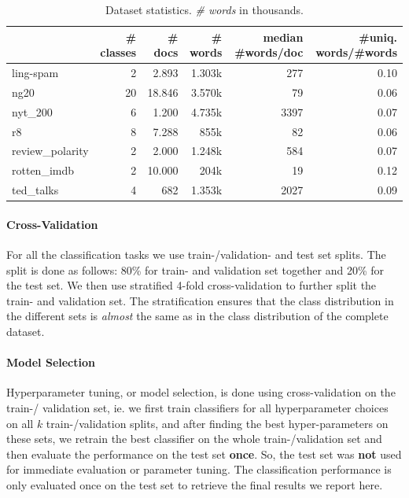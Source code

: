 
\begin{table}[htb!]
\centering
\begin{tabular}{lrrrrr}
{} &  \# classes &  \# docs & \# words & median \#words/doc &  \#uniq. words/\#words \\
\midrule
ling-spam       & 2 &  2.893 &  1.303k & 277 & 0.10 \\
ng20            & 20 &  18.846 &  3.570k & 79 & 0.06 \\
nyt\_200         & 6 &  1.200 &  4.735k & 3397 & 0.07 \\
r8              & 8 &  7.288 &  855k & 82 & 0.06 \\
review\_polarity & 2 &  2.000 &  1.248k & 584 & 0.07 \\
rotten\_imdb     & 2 &  10.000 &  204k & 19 & 0.12 \\
ted\_talks       & 4 &  682 &  1.353k & 2027 & 0.09 \\
\bottomrule
\end{tabular}
\caption[Statistics: Datasets]{Dataset statistics. \textit{\# words} in thousands.}\label{table:dataset_statistics}
\end{table}



\paragraph{Cross-Validation}
For all the classification tasks we use train-/validation- and test set splits.
The split is done as follows: 80\% for train- and validation set together and 20\% for the test set.
We then use stratified 4-fold cross-validation to further split the train- and validation set.
The stratification ensures that the class distribution in the different sets is \textit{almost} the same as in the class distribution of the complete dataset.

\paragraph{Model Selection}
Hyperparameter tuning, or model selection, is done using cross-validation on the train-/ validation set, ie. we first train classifiers for all hyperparameter choices on all $k$ train-/validation splits, and after finding the best hyper-parameters on these sets, we retrain the best classifier on the whole train-/validation set and then evaluate the performance on the test set \textbf{once}.
So, the test set was \textbf{not} used for immediate evaluation or parameter tuning.
The classification performance is only evaluated once on the test set to retrieve the final results we report here.

